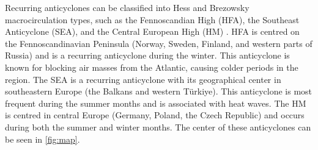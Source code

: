 Recurring anticyclones can be classified into Hess and Brezowsky macrocirculation types, such as the Fennoscandian High (HFA), the Southeast Anticyclone (SEA), and the Central European High (HM) \cite{bartholyEuropeanCycloneTrack2006}. HFA is centred on the Fennoscandinavian Peninsula (Norway, Sweden, Finland, and western parts of Russia) and is a recurring anticyclone during the winter. This anticyclone is known for blocking air masses from the Atlantic, causing colder periods in the region. The SEA is a recurring anticyclone with its geographical center in southeastern Europe (the Balkans and western Türkiye). This anticyclone is most frequent during the summer months and is associated with heat waves. The HM is centred in central Europe (Germany, Poland, the Czech Republic) and occurs during both the summer and winter months. The center of these anticyclones can be seen in \autoref{fig:map}. 

